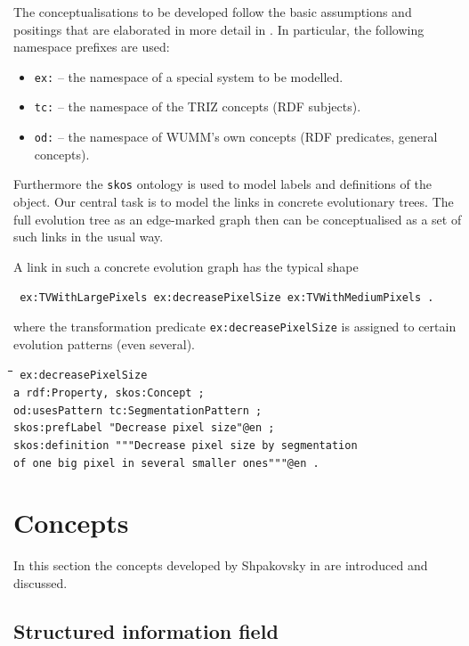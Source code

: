 \documentclass[11pt,a4paper]{article}
\newenvironment{code}{\tt \begin{tabbing}
\hskip12pt\=\hskip12pt\=\hskip12pt\=\hskip12pt\=\hskip5cm\=\hskip5cm\=\kill}
{\end{tabbing}}
\begin{document}
The conceptualisations to be developed follow the basic assumptions and
positings that are elaborated in more detail in \cite{Graebe2021}. In
particular, the following namespace prefixes are used:
\begin{itemize}[noitemsep]
\item \texttt{ex:} -- the namespace of a special system to be modelled. 
\item \texttt{tc:} -- the namespace of the TRIZ concepts (RDF subjects).
\item \texttt{od:} -- the namespace of WUMM's own concepts (RDF predicates,
  general concepts). 
\end{itemize}
Furthermore the \texttt{skos} ontology is used to model labels and definitions of the object.
Our central task is to model the links in concrete evolutionary trees. The
full evolution tree as an edge-marked graph then can be conceptualised as a
set of such links in the usual way.

A link in such a concrete evolution graph has the typical shape
\begin{center}\tt
  ex:TVWithLargePixels ex:decreasePixelSize ex:TVWithMediumPixels .
\end{center}
where the transformation predicate \texttt{ex:decreasePixelSize} is assigned
to certain evolution patterns (even several).
\begin{code}\tt
ex:decreasePixelSize \\
\> a rdf:Property, skos:Concept ; \\
\> od:usesPattern tc:SegmentationPattern ; \\
\> skos:prefLabel "Decrease pixel size"@en ; \\
\> skos:definition """Decrease pixel size by segmentation \\
\>\> of one big pixel in several smaller ones"""@en .
\end{code}

\section{Concepts}

In this section the concepts developed by Shpakovsky in \cite{Shpakovsky2016} are introduced and discussed.

\subsection{Structured information field}
\end{document}
